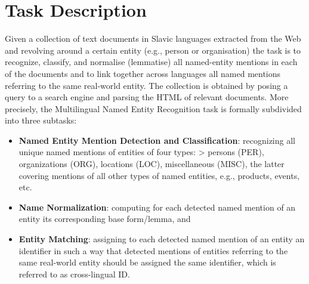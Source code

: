 \documentclass[11pt]{article}
\begin{document}
\section{Task Description}
\label{sec:task}

Given a collection of text documents in Slavic languages extracted from the Web
and revolving around a certain entity (e.g., person or organisation) the task
is to recognize, classify, and normalise (lemmatise) all named-entity mentions
in each of the documents and to link together across languages all named
mentions referring to the same real-world entity.  The collection is obtained
by posing a query to a search engine and parsing the HTML of relevant
documents. More precisely, the Multilingual Named Entity Recognition task is
formally subdivided into three subtasks:


\begin{itemize}

\item \textbf{Named Entity Mention Detection and Classification}: recognizing all unique named mentions of entities of four types:
> persons (PER), organizations (ORG), locations (LOC), miscellaneous (MISC), the latter covering mentions of all other types of named entities, e.g., products, events, etc.

\item \textbf{Name Normalization}: computing for each detected named mention of an entity its corresponding base form/lemma, and

\item \textbf{Entity Matching}: assigning to each detected named mention of an entity an identifier in such a way that detected 
mentions of entities referring to the same real-world entity should be assigned the same identifier, which is referred to as 
cross-lingual ID.

\end{itemize}
\end{document}
